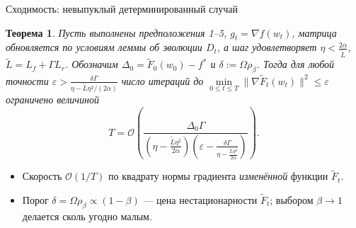 \documentclass[aspectratio=169, 12pt]{beamer}
\newtheorem{theorem_rus}{Теорема}
\begin{document}
\begin{frame}{Сходимость: невыпуклый детерминированный случай}
    \begin{theorem_rus}
    \label{theor:1}
    \small
    Пусть выполнены предположения 1--5, $g_t = \nabla f(w_t)$, матрица обновляется по условиям леммы об эволюции $D_t$, а шаг удовлетворяет $\eta < \frac{2 \alpha}{\widetilde{L}}$, $\widetilde{L} = L_f + \Gamma L_{r}$. Обозначим $\Delta_0 = \widetilde{F}_0(w_0) - f^*$ и $\delta := \Omega \rho_\beta$. Тогда для любой точности $\varepsilon > \frac{\delta\Gamma}{\eta - \widetilde{L}\eta^2/(2\alpha)}$ число итераций до $\min\limits_{0 \le t \le T} \|\nabla\widetilde{F}_t(w_t)\|^2 \leq \varepsilon$ ограничено величиной
    \vspace{-0.1cm}
    \begin{equation*}
      T = \mathcal{O}\left( \frac{\Delta_0 \Gamma}{(\eta - \frac{\widetilde{L}\eta^2}{2\alpha}) \left( \varepsilon -\frac{\delta\Gamma}{\eta - \frac{\widetilde{L}\eta^2}{2\alpha}}\right)} \right).
    \end{equation*}
\end{theorem_rus}
\begin{itemize}
    \small
    \item Скорость $\mathcal{O}(1/T)$ по квадрату нормы градиента \emph{изменённой} функции $\widetilde{F}_t$.
    \item Порог $\delta = \Omega\rho_\beta \propto (1-\beta)$ --- цена нестационарности $\widetilde{F}_t$; выбором $\beta \to 1$ делается сколь угодно малым.
\end{itemize}
\end{frame}
\end{document}
